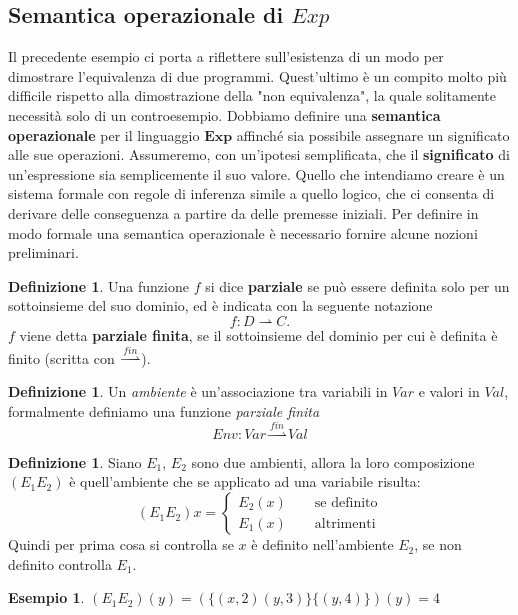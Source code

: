 \documentclass{article}
\theoremstyle{definition}
\theoremstyle{definition}
\theoremstyle{definition}
\newtheorem{definition}[theorem]{Definizione}
\newtheorem{example}[theorem]{Esempio}
\theoremstyle{remark}
\begin{document}
    \subsection{Semantica operazionale di $Exp$}
    Il precedente esempio ci porta a riflettere sull'esistenza di un modo per dimostrare
    l'equivalenza di due programmi. Quest'ultimo è un compito molto più difficile rispetto alla
    dimostrazione della "non equivalenza", la quale solitamente necessità solo di un controesempio.
    Dobbiamo  definire una \textbf{semantica operazionale} per il linguaggio $\boldsymbol{Exp}$ affinché sia possibile assegnare
    un significato alle sue operazioni. Assumeremo, con un'ipotesi semplificata, che il \textbf{significato} di un'espressione sia semplicemente il suo
    valore. Quello che intendiamo creare è un sistema formale con regole di inferenza simile a quello logico, che ci consenta di derivare delle conseguenza a partire da delle premesse iniziali.
    Per definire in modo formale una semantica operazionale è necessario fornire alcune
    nozioni preliminari.
    \begin{definition}
        Una funzione $f$ si dice \textbf{parziale} se può essere definita solo per un sottoinsieme del suo dominio, ed è indicata con la seguente notazione
        $$f: D\rightharpoonup C.$$
        $f$ viene detta \textbf{parziale finita}, se il sottoinsieme del dominio per cui è definita è finito (scritta con $\overset{fin}\rightharpoonup$).

    \end{definition}
    \begin{definition}
        Un \textit{ambiente} è un'associazione tra variabili in $Var$ e valori in $Val$, formalmente definiamo una funzione \textit{parziale finita}
        $$Env:Var\overset{fin}\rightharpoonup Val$$
    \end{definition}
    \begin{definition}
        Siano $E_1$, $E_2$ sono due ambienti, allora la loro composizione $(E_1E_2)$ è quell'ambiente  che se applicato ad una variabile risulta:
        $$(E_1E_2)x =\left\{ \begin{array}{cl}E_2(x) \qquad \text{se definito} \\
                E_1(x) \qquad \text{altrimenti}\end{array} \right.$$
        Quindi per prima cosa si controlla se $x$ è definito nell'ambiente $E_2$, se non definito controlla $E_1$.
    \end{definition}
    \begin{example}$(E_1E_2)(y) = (\{(x,2)(y,3)\}\{(y,4)\})(y) = 4$\end{example}
\end{document}
